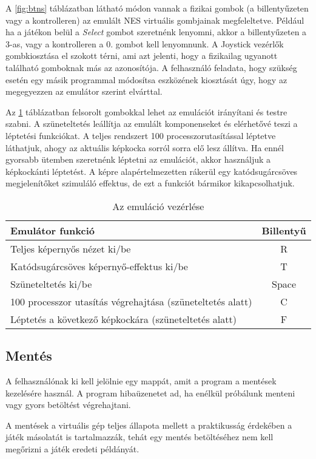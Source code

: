 A \ref{fig:btns} táblázatban látható módon vannak a fizikai gombok (a billentyűzeten vagy a kontrolleren) az emulált NES virtuális gombjainak megfeleltetve. Például ha a játékon belül a \emph{Select} gombot szeretnénk lenyomni, akkor a billentyűzeten a 3-as, vagy a kontrolleren a 0. gombot kell lenyomnunk.
A Joystick vezérlők gombkiosztása el szokott térni, ami azt jelenti, hogy a fizikailag ugyanott található gomboknak más az azonosítója. A felhasználó feladata, hogy szükség esetén egy másik programmal módosítsa eszközének kiosztását úgy, hogy az megegyezzen az emulátor szerint elvárttal.

Az \ref{fig:emucontrol} táblázatban felsorolt gombokkal lehet az emulációt irányítani és testre szabni. A szüneteltetés leállítja az emulált komponenseket és elérhetővé teszi a léptetési funkciókat. A teljes rendszert 100 processzorutasítással léptetve láthatjuk, ahogy az aktuális képkocka sorról sorra elő lesz állítva. Ha ennél gyorsabb ütemben szeretnénk léptetni az emulációt, akkor használjuk a képkockánti léptetést. A képre alapértelmezetten rákerül egy katódsugárcsöves megjelenítőket szimuláló effektus, de ezt a funkciót bármikor kikapcsolhatjuk.

\begin{table}[H]
	\centering
	\begin{tabular}{ | l | c | }
		\hline
		Emulátor funkció & Billentyű \\
		\hline			
		Teljes képernyős nézet ki/be & R \\
		Katódsugárcsöves képernyő-effektus ki/be & T \\
		Szüneteltetés ki/be & Space \\
		100 processzor utasítás végrehajtása (szüneteltetés alatt) & C \\
		Léptetés a következő képkockára (szüneteltetés alatt) & F \\
		\hline
	\end{tabular}
	\caption{Az emuláció vezérlése}
	\label{fig:emucontrol}
\end{table}

\subsection{Mentés}

A felhasználónak ki kell jelölnie egy mappát, amit a program a mentések kezelésére használ. A program hibaüzenetet ad, ha enélkül próbálunk menteni vagy gyors betöltést végrehajtani.

A mentések a virtuális gép teljes állapota mellett a praktikusság érdekében a játék másolatát is tartalmazzák, tehát egy mentés betöltéséhez nem kell megőrizni a játék eredeti példányát.

